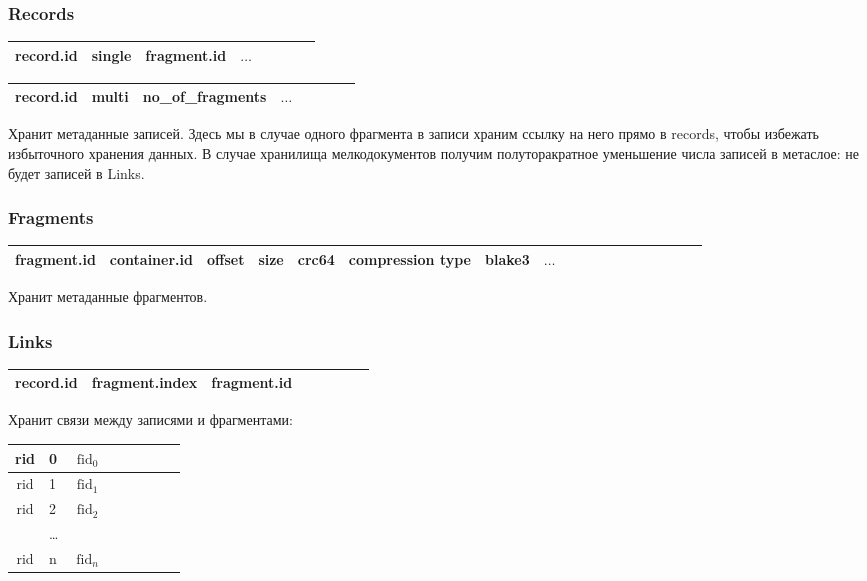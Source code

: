\documentclass[a4paper,12pt]{article}
\begin{document}
\subsubsection{Records}

\begin{tabular}{|Sl|Sc|Sc|Sr|}
  \hline
  record.id & single & fragment.id & $\dots$ \\
  \hline
\end{tabular}

\bigskip

\begin{tabular}{|Sl|Sc|Sc|Sr|}
  \hline
  record.id & multi & no\_of\_fragments & $\dots$ \\
  \hline
\end{tabular}

\bigskip
Хранит метаданные записей. Здесь мы в случае одного фрагмента в записи храним ссылку на него прямо в records, чтобы избежать
избыточного хранения данных. В случае хранилища мелкодокументов получим полуторакратное уменьшение числа записей в метаслое: не будет
записей в Links.

\subsubsection{Fragments}

\begin{tabular}{|Sl|Sc|Sc|Sc|Sc|Sc|Sc|Sc|Sr|}
  \hline
  fragment.id & container.id & offset & size & crc64 & compression type & blake3 & $\dots$ \\
  \hline
\end{tabular}

\bigskip
Хранит метаданные фрагментов.


\subsubsection{Links}

\begin{tabular}{|Sl|Sc|Sc|Sr|}
  \hline
  record.id & fragment.index & fragment.id \\
  \hline
\end{tabular}

\bigskip
Хранит связи между записями и фрагментами:
\bigskip

\begin{tabular}{|Sl|Sc|Sc|Sr|}
  \hline
  rid & 0 & $\operatorname{fid}_0$ \\
  \hline
  rid & 1 & $\operatorname{fid}_1$ \\
  \hline
  rid & 2 & $\operatorname{fid}_2$ \\
  \hline
  & \dots & \\
  \hline
  rid & n & $\operatorname{fid}_n$ \\
  \hline
\end{tabular}
\end{document}
